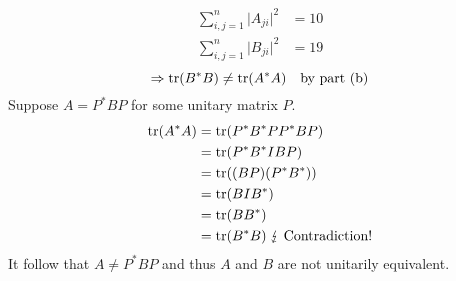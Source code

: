 \begin{enumerate}
\begin{align}
\sum\limits_{i,j=1}^n\lvert A_{ji}\rvert^2  &= 10\\
\sum\limits_{i,j=1}^n\lvert B_{ji}\rvert^2  &= 19
\end{align}
\begin{equation}
\Rightarrow \text{tr}({B^*B}) \neq \text{tr}({A^*A}) \quad \text{by part (b)}
\end{equation}
Suppose $A = P^*BP$ for some unitary matrix $P.$
\begin{align}
\text{tr}({A^*A}) &= \text{tr}({P^*B^*PP^*BP})\\
&= \text{tr}({P^*B^*IBP})\\
&=\text{tr}({(BP)(P^*B^*)})\\
&=\text{tr}({BIB^*})\\
&=\text{tr}({BB^*})\\
&=\text{tr}({B^*B}) \; \lightning \text{ Contradiction!}
\end{align}
It follow that $A \neq P^*BP$ and thus $A$ and $B$ are not unitarily
equivalent.
\end{enumerate}
